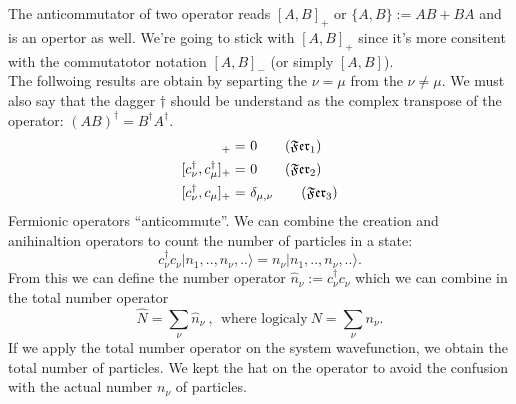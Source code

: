 \documentclass[../main.tex]{subfile}
\begin{document}
The anticommutator of two operator reads $[A,B]_{+}$ or $\{A,B\} := AB + BA$ and is an opertor as well.
We're going to stick with $[A,B]_{+}$ since it's more consitent with the commutatotor notation $[A,B]_{-}$ (or simply $[A,B]$).\\

The follwoing results are obtain by separting the $\nu = \mu$ from the $\nu \neq \mu$. We must also say that the dagger $\dagger$ 
should be understand as the complex transpose of the operator: $(AB)^{\dagger} = B^{\dagger}A^{\dagger}$.
\begin{align}
    [c_{\nu},c_{\mu}]_+ =&~ 0 \label{eq:Fermion1} \tag{$\mathfrak{Fer}_1$}\\
    [c^{\dagger}_{\nu},c^{\dagger}_{\mu}]_+ =&~0 \label{eq:Fermion2} \tag{$\mathfrak{Fer}_2$}\\
    [c^{\dagger}_{\nu},c_{\mu}]_+ =&~ \delta_{\mu,\nu}\label{eq:Fermion3} \tag{$\mathfrak{Fer}_3$}
\end{align} 
Fermionic operators ``anticommute''.
We can combine the creation and anihinaltion operators to count the number of particles in a state:
\[
    c_{\nu}^{\dagger} c_{\nu} |n_{1},..,n_{\nu},..\rangle = n_{\nu}|n_{1},..,n_{\nu},..\rangle.
\]  
From this we can define the number operator $\hat{n}_{\nu}:= c_{\nu}^{\dagger} c_{\nu}$ which we can combine in the total number operator
\[
    \hat{N} = \sum_{\nu} \hat{n}_{\nu}~,~~\text{where logicaly}~ N = \sum_{\nu} n_{\nu}.
\]
If we apply the total number operator on the system wavefunction, we obtain the total number of particles.
We kept the hat on the operator to avoid the confusion with the actual number $n_{\nu}$ of particles.\\
\end{document}

